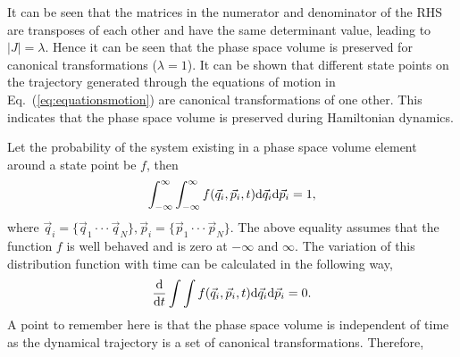 \documentclass[a4paper]{article}
\begin{document}
It can be seen that the matrices in the numerator and denominator of the RHS are transposes of each other and have the same determinant value, leading to $|J|=\lambda$. Hence it can be seen that the phase space volume is preserved for canonical transformations ($\lambda=1$). It can be shown that different state points on the trajectory generated through the equations of motion in Eq.~(\ref{eq:equationsmotion}) are canonical transformations of one other. This indicates that the phase space volume is preserved during Hamiltonian dynamics. 

Let the probability of the system existing in a  phase space volume element around a state point  be $f$, then
\begin{equation}
\int^{\infty}_{-\infty}\int^{\infty}_{-\infty}f(\vec{q}_{i},\vec{p}_{i},t) {\rm d}\vec{q}_{i} {\rm d}\vec{p}_{i}=1,
\end{equation}
where $\vec{q}_{i}=\{\vec{q}_{1}\cdot\cdot\cdot\vec{q}_{N}\}, \vec{p}_{i}=\{\vec{p}_{1}\cdot\cdot\cdot\vec{p}_{N}\}$. The above equality assumes that the function $f$ is well behaved and is zero at $-\infty$ and $\infty$. The variation of this distribution function with time can be calculated in the following way,
\begin{equation}
\begin{split}
\frac{{\rm d}}{{\rm d}t}\int\int f(\vec{q}_{i},\vec{p}_{i},t) {\rm d}\vec{q}_{i} {\rm d}\vec{p}_{i}=0.
\end{split}
\end{equation}
A point to remember here is that the phase space volume is independent of time as the dynamical trajectory is a set of canonical transformations. Therefore,
\end{document}
